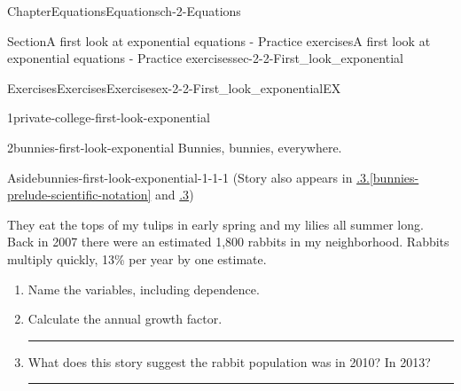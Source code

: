 \documentclass[twoside,11pt,]{book}
\newcommand{\xreffont}{\relax}
\newlength{\workspacestrutwidth}
\numberwithin{equation}{section}
\newcommand{\amp}{&}
\begin{document}
\begin{chapterptx}{Chapter}{Equations}{}{Equations}{}{}{ch-2-Equations}
\begin{sectionptx}{Section}{A first look at exponential equations - Practice exercises}{}{A first look at exponential equations - Practice exercises}{}{}{sec-2-2-First_look_exponential}
\begin{exercises-subsection-numberless}{Exercises}{Exercises}{}{Exercises}{}{}{ex-2-2-First_look_exponentialEX}
\begin{divisionexercise}{1}{}{}{private-college-first-look-exponential}
\end{divisionexercise}%
\clearpage
\begin{divisionexercise}{2}{}{}{bunnies-first-look-exponential}%
Bunnies, bunnies, everywhere. \begin{aside}{Aside}{}{bunnies-first-look-exponential-1-1-1}%
(Story also appears in \hyperref[bunnies-prelude-scientific-notation]{{\xreffont 0.8.3}.{\xreffont\ref{bunnies-prelude-scientific-notation}}} and \hyperlink{bunnies-modeling-exponential}{{\xreffont 5.1.3}})%
\end{aside}
 They eat the tops of my tulips in early spring and my lilies all summer long. Back in 2007 there were an estimated 1,800 rabbits in my neighborhood. Rabbits multiply quickly, 13\% per year by one estimate.%
\begin{enumerate}[label=(\alph*),ref=\alph*]%
\item{}Name the variables, including dependence.%
\par
    \hspace{-2cm}
%
%
\item{}Calculate the annual growth factor.%
\par\rule{\workspacestrutwidth}{1.5in}%
\item{}What does this story suggest the rabbit population was in 2010? In 2013?%
\par\rule{\workspacestrutwidth}{1.5in}%

\end{enumerate}
\end{divisionexercise}
\end{exercises-subsection-numberless}
\end{sectionptx}
\end{chapterptx}
\end{document}
